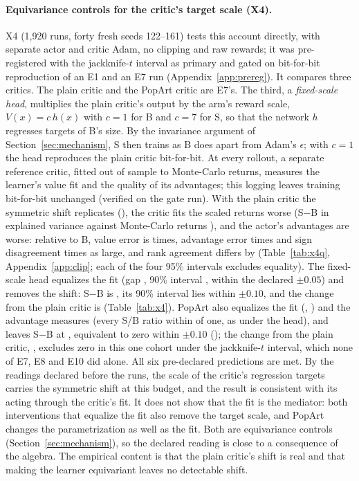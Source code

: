 \paragraph{Equivariance controls for the critic's target scale (X4).}
X4 (1,920 runs, forty fresh seeds 122--161) tests this account directly, with separate actor and critic Adam, no
clipping and raw rewards; it was pre-registered with the jackknife-$t$ interval as primary and gated on bit-for-bit
reproduction of an E1 and an E7 run (Appendix~\ref{app:prereg}). It compares three critics. The plain critic and the
PopArt critic are E7's. The third, a \emph{fixed-scale head}, multiplies the plain critic's output by the arm's reward
scale, $V(x)=c\,h(x)$ with $c=1$ for B and $c=7$ for S, so that the network $h$ regresses targets of B's size. By the
invariance argument of Section~\ref{sec:mechanism}, S then trains as B does apart from Adam's $\epsilon$; with $c=1$ the
head reproduces the plain critic bit-for-bit. At every rollout, a separate reference critic, fitted out of sample to
Monte-Carlo returns, measures the learner's value fit and the quality of its advantages; this logging leaves training
bit-for-bit unchanged (verified on the gate run). With the plain critic the symmetric shift replicates (\VxfPlain{}), the critic fits the scaled
returns worse (S$-$B in explained variance against Monte-Carlo returns \VxfFitPlain{}), and the actor's
advantages are worse: relative to B, value error is \VxfVerr{} times, advantage error \VxfGae{} times and sign
disagreement \VxfSign{} times as large, and rank agreement differs by \VxfRank{} (Table~\ref{tab:x4q}, Appendix~\ref{app:clip}; each of the four
95\% intervals excludes equality). The fixed-scale head equalizes the fit (gap \VxfFitHead{}, 90\% interval
\VxfFitHeadNinety{}, within the declared $\pm0.05$) and removes the shift: S$-$B is \VxfHead{}, its 90\% interval
\VxfHeadNinety{} lies within $\pm0.10$, and the change from the plain critic is \VxfChHead{} (Table~\ref{tab:x4}). PopArt also equalizes the fit (\VxfFitPop{}, \VxfFitPopNinety{}) and the advantage measures (every S/B ratio within \VxfQualMax{} of one, as under the head), and leaves S$-$B at \VxfPop{}, equivalent to zero within $\pm0.10$ (\VxfPopNinety{});
the change from the plain critic, \VxfChPop{}, excludes zero in this one cohort under the jackknife-$t$ interval, which none of E7, E8 and E10 did alone.
All six pre-declared predictions are met. By the readings declared before the runs, the scale of the critic's
regression targets carries the symmetric shift at this budget, and the result is consistent with its acting through
the critic's fit. It does not show that the fit is the mediator: both interventions that equalize the fit also remove
the target scale, and PopArt changes the parametrization as well as the fit. Both are equivariance controls
(Section~\ref{sec:mechanism}), so the declared reading is close to a consequence of the algebra. The empirical content is
that the plain critic's shift is real and that making the learner equivariant leaves no detectable shift.

